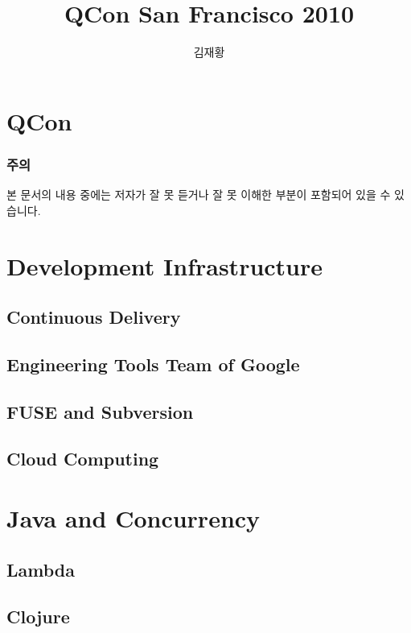 \documentclass[10pt,unicode,serif,compress,slidetop]{beamer}
\title{QCon San Francisco 2010}
\author{김재황}
\institute{소프트웨어 센터}
\begin{document}
\begin{frame}[plain]
    \titlepage
\end{frame}

\section{QCon}


\begin{frame}
\frametitle{주의}

본 문서의 내용 중에는 저자가 잘 못 듣거나 잘 못 이해한 부분이 
포함되어 있을 수 있습니다.

\end{frame}

\section{Development Infrastructure}
\subsection{Continuous Delivery}

\subsection{Engineering Tools Team of Google}

\subsection{FUSE and Subversion}

\subsection{Cloud Computing}


\section{Java and Concurrency}

\subsection{Lambda}


\subsection{Clojure}


\end{document}
